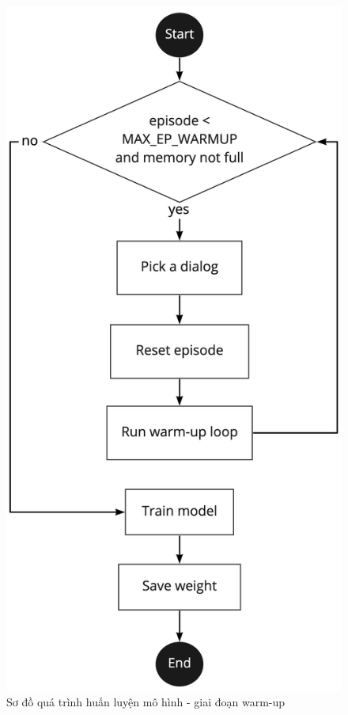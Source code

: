 \begin{center}
    \begin{figure}[h!]
        \begin{center}
         \includegraphics[scale=0.17]{chapter4/img/warmup_flow.jpg}
        \end{center}
        \caption{Sơ đồ quá trình huấn luyện mô hình - giai đoạn warm-up}
        \label{fig:warmupflow}
    \end{figure}
\end{center}

